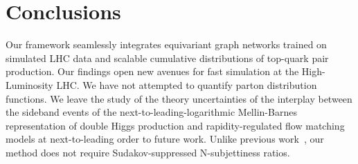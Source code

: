 \section{Conclusions}\label{sec:conclusions}

Our framework seamlessly integrates equivariant graph networks trained
on simulated LHC data and scalable cumulative distributions of top-quark
pair production. Our findings open new avenues for fast simulation at
the High-Luminosity LHC. We have not attempted to quantify parton
distribution functions. We leave the study of the theory uncertainties
of the interplay between the sideband events of the
next-to-leading-logarithmic Mellin-Barnes representation of double Higgs
production and rapidity-regulated flow matching models at
next-to-leading order to future work. Unlike previous
work~\cite{TPC:0266-Towards-the-Energy-Movers-Distance-at-Two-Loops-September-19-2026},
our method does not require Sudakov-suppressed N-subjettiness ratios.

